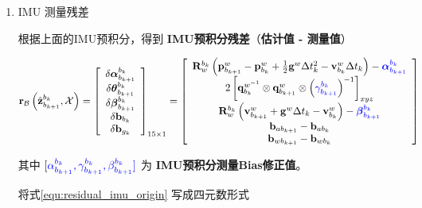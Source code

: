 \documentclass[12pt,a4paper]{article}
\begin{document}
\begin{enumerate}

\item IMU 测量残差

根据上面的IMU预积分，得到 \textbf{IMU预积分残差}（\textbf{估计值 - 测量值}）

\begin{equation}
\label{equ:residual_imu_origin}
\mathbf{r}_{\mathcal{B}}\left(\hat{\mathbf{z}}_{b_{k+1}}^{b_{k}}, \mathcal{X}\right) 
=
\left[\begin{array}{c}
{\delta \boldsymbol{\alpha}_{b_{k+1}}^{b_{k}}} \\ 
{\delta \boldsymbol{\theta}_{b_{k+1}}^{b_{k}}} \\
{\delta \boldsymbol{\beta}_{b_{k+1}}^{b_{k}}} \\ 
{\delta \mathbf{b}_{b_{k}}} \\ 
{\delta \mathbf{b}_{g_{k}}}
\end{array}\right]_{15 \times 1} 
= 
\left[\begin{array}{c}
{\mathbf{R}_{w}^{b_{k}}
\left(\mathbf{p}_{b_{k+1}}^{w}-\mathbf{p}_{b_{k}}^{w}+\frac{1}{2} \mathbf{g}^{w} \Delta t_{k}^{2}-\mathbf{v}_{b_{k}}^{w} \Delta t_{k}\right)-
\color{blue}{\boldsymbol{\alpha}_{b_{k+1}}^{b_{k}}}} \\ 
{2\left[\mathbf{q}_{b_{k}}^{w^{-1}} \otimes \mathbf{q}_{b_{k+1}}^{w} \otimes\left({\color{blue}{{\gamma}_{b_{k+1}}^{b_{k}}}}\right)^{-1}\right]_{x y z}} \\
{\mathbf{R}_{w}^{b_{k}}\left(\mathbf{v}_{b_{k+1}}^{w}+\mathbf{g}^{w} \Delta t_{k}-\mathbf{v}_{b_{k}}^{w}\right) - \color{blue}{\boldsymbol{\beta}}_{b_{k+1}}^{b_{k}}} \\  
{\mathbf{b}_{a b_{k+1}}-\mathbf{b}_{a b_{k}}} \\ 
{\mathbf{b}_{w b_{k+1}}-\mathbf{b}_{w b_{k}}}
\end{array}\right]
\end{equation}

其中 $[\color{blue}{{\alpha}^{b_{k}}_{b_{k+1}},{\gamma}^{b_{k}}_{b_{k+1}},{\beta}^{b_{k}}_{b_{k+1}}}]$ 为 \textbf{IMU预积分测量Bias修正值}。

将式\eqref{equ:residual_imu_origin} 写成四元数形式


\end{enumerate}
\end{document}
